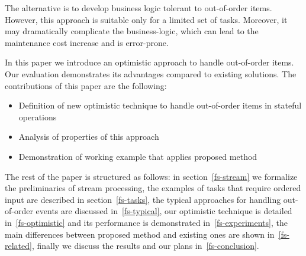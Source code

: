 The alternative is to develop business logic tolerant to out-of-order items. However, this approach is suitable only for a limited set of tasks. Moreover, it may dramatically complicate the business-logic, which can lead to the maintenance cost increase and is error-prone.

In this paper we introduce an optimistic approach to handle out-of-order items. Our evaluation demonstrates its advantages compared to existing solutions. The contributions of this paper are the following: 

\begin {itemize}
  \item Definition of new optimistic technique to handle out-of-order items in stateful operations
  \item Analysis of properties of this approach
  \item Demonstration of working example that applies proposed method
\end {itemize}

The rest of the paper is structured as follows: in section~\ref{fs-stream} we formalize the preliminaries of stream processing, the examples of tasks that require ordered input are described in section~\ref{fs-tasks}, the typical approaches for handling out-of-order events are discussed in~\ref{fs-typical}, our optimistic technique is detailed in~\ref{fs-optimistic} and its performance is demonstrated in~\ref{fs-experiments}, the main differences between proposed method and existing ones are shown in~\ref{fs-related}, finally we discuss the results and our plans in~\ref{fs-conclusion}.
